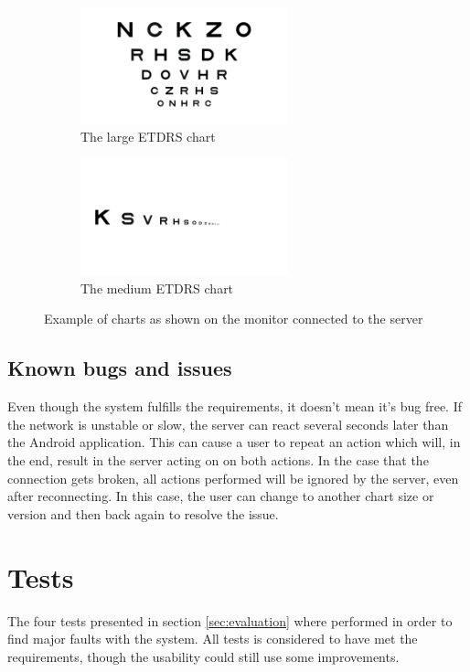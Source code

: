 \documentclass[12pt,a4paper,notitlepage]{report}
\begin{document}
\begin{figure}[ht!]
\centering
\begin{subfigure}{.5\textwidth}
  \centering
  \includegraphics[width=60mm]{images/servergui/etdrs_chart.png}
  \caption{The large ETDRS chart}
  \label{fig:server_large}
\end{subfigure}%
\begin{subfigure}{.5\textwidth}
  \centering
  \includegraphics[width=60mm]{images/servergui/etdrs_single_row.png}
  \caption{The medium ETDRS chart}
  \label{fig:server_medium}
\end{subfigure}
\caption{Example of charts as shown on the monitor connected to the server}
\label{fig:server_charts}
\end{figure}

\subsection{Known bugs and issues}
Even though the system fulfills the requirements, it doesn't mean it's bug free. If the network is unstable or slow, the server can react several seconds later than the Android application. This can cause a user to repeat an action which will, in the end, result in the server acting on on both actions. In the case that the connection gets broken, all actions performed will be ignored by the server, even after reconnecting. In this case, the user can change to another chart size or version and then back again to resolve the issue.

\section{Tests}
The four tests presented in section \ref{sec:evaluation} where performed in order to find major faults with the system. All tests is considered to have met the requirements, though the usability could still use some improvements.
\end{document}
